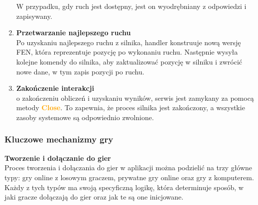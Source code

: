 \documentclass[12pt,a4paper]{article}
\begin{document}
\begin{enumerate}
    W przypadku, gdy ruch jest dostępny, jest on wyodrębniany z odpowiedzi i zapisywany.

    \item \textbf{Przetwarzanie najlepszego ruchu}\\
    Po uzyskaniu najlepszego ruchu z silnika, handler konstruuje nową wersję FEN, która reprezentuje pozycję po wykonaniu ruchu. Następnie wysyła kolejne komendy do silnika, aby zaktualizować pozycję w silniku i zwrócić nowe dane, w tym zapis pozycji po ruchu.

    \item \textbf{Zakończenie interakcji}\\
    o zakończeniu obliczeń i uzyskaniu wyników, serwis jest zamykany za pomocą metody \textcolor{orange}{\textbf{Close}}. To zapewnia, że proces silnika jest zakończony, a wszystkie zasoby systemowe są odpowiednio zwolnione.
\end{enumerate}

\newpage
\subsubsection{Kluczowe mechanizmy gry}

\noindent \textbf{Tworzenie i dołączanie do gier}\\
Proces tworzenia i dołączania do gier w aplikacji można podzielić na trzy główne typy: gry online z losowym graczem, prywatne gry online oraz gry z komputerem. Każdy z tych typów ma swoją specyficzną logikę, która determinuje sposób, w jaki gracze dołączają do gier oraz jak te są one inicjowane.
\end{document}
